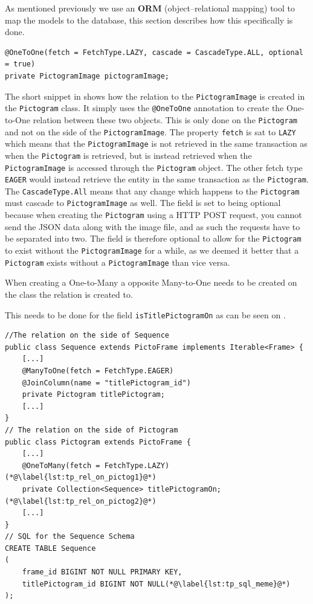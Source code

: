 As mentioned previously we use an \textbf{ORM} (object--relational mapping) tool to map the models to the database, this section describes how this specifically is done.

\begin{lstlisting}[float, floatplacement=h, caption={Fields with annotations which causes Hibernate to perform the ORM for a \texttt{PictogramImage}.},label={lst:PictoImage}]
@OneToOne(fetch = FetchType.LAZY, cascade = CascadeType.ALL, optional = true)
private PictogramImage pictogramImage;
\end{lstlisting}

The short snippet in  shows how the relation to the \texttt{PictogramImage} is created in the \texttt{Pictogram} class.
It simply uses the \texttt{@OneToOne} annotation to create the One-to-One relation between these two objects.
This is only done on the \texttt{Pictogram} and not on the side of the \texttt{PictogramImage}.
The property \texttt{fetch} is sat to \texttt{LAZY} which means that the \texttt{PictogramImage} is not retrieved in the same transaction as when the \texttt{Pictogram} is retrieved, but is instead retrieved when the \texttt{PictogramImage} is accessed through the \texttt{Pictogram} object.
The other fetch type \texttt{EAGER} would instead retrieve the entity in the same transaction as the \texttt{Pictogram}.
The \texttt{CascadeType.All} means that any change which happens to the \texttt{Pictogram} must cascade to \texttt{PictogramImage} as well.
The field is set to being optional because when creating the \texttt{Pictogram} using a HTTP POST request, you cannot send the JSON data along with the image file, and as such the requests have to be separated into two.
The field is therefore optional to allow for the \texttt{Pictogram} to exist without the \texttt{PictogramImage} for a while, as we deemed it better that a \texttt{Pictogram} exists without a \texttt{PictogramImage} than vice versa.

When creating a One-to-Many a opposite Many-to-One needs to be created on the class the relation is created to.

This needs to be done for the field \texttt{isTitlePictogramOn} as can be seen on .

\begin{lstlisting}[float, floatplacement=h, caption={Fields with annotations which causes Hibernate to perform the ORM for \texttt{titlePictogram}. \texttt{[...]} denotes omitted code.},label={lst:titlePictogram}]
//The relation on the side of Sequence
public class Sequence extends PictoFrame implements Iterable<Frame> {
	[...]
	@ManyToOne(fetch = FetchType.EAGER)
	@JoinColumn(name = "titlePictogram_id")
	private Pictogram titlePictogram;
	[...]
}
// The relation on the side of Pictogram
public class Pictogram extends PictoFrame {
	[...]
    @OneToMany(fetch = FetchType.LAZY)(*@\label{lst:tp_rel_on_pictog1}@*)
	private Collection<Sequence> titlePictogramOn;(*@\label{lst:tp_rel_on_pictog2}@*)
	[...]
}
// SQL for the Sequence Schema
CREATE TABLE Sequence
(
    frame_id BIGINT NOT NULL PRIMARY KEY,
    titlePictogram_id BIGINT NOT NULL(*@\label{lst:tp_sql_meme}@*)
);
\end{lstlisting}

